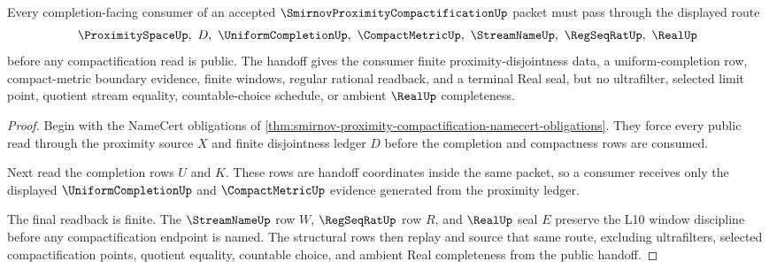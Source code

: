 \begin{theorem}
\label{thm:smirnov-proximity-compactification-uniform-handoff}
Every completion-facing consumer of an accepted $\SmirnovProximityCompactificationUp$ packet must pass through the displayed route
$$
\ProximitySpaceUp,\ D,\ \UniformCompletionUp,\ \CompactMetricUp,\ \StreamNameUp,\ \RegSeqRatUp,\ \RealUp
$$
before any compactification read is public. The handoff gives the consumer finite proximity-disjointness data, a uniform-completion row, compact-metric boundary evidence, finite windows, regular rational readback, and a terminal Real seal, but no ultrafilter, selected limit point, quotient stream equality, countable-choice schedule, or ambient $\RealUp$ completeness.
\end{theorem}
\begin{proof}
Begin with the NameCert obligations of \autoref{thm:smirnov-proximity-compactification-namecert-obligations}. They force every public read through the proximity source $X$ and finite disjointness ledger $D$ before the completion and compactness rows are consumed.

Next read the completion rows $U$ and $K$. These rows are handoff coordinates inside the same packet, so a consumer receives only the displayed $\UniformCompletionUp$ and $\CompactMetricUp$ evidence generated from the proximity ledger.

The final readback is finite. The $\StreamNameUp$ row $W$, $\RegSeqRatUp$ row $R$, and $\RealUp$ seal $E$ preserve the L10 window discipline before any compactification endpoint is named. The structural rows then replay and source that same route, excluding ultrafilters, selected compactification points, quotient equality, countable choice, and ambient Real completeness from the public handoff.
\end{proof}



